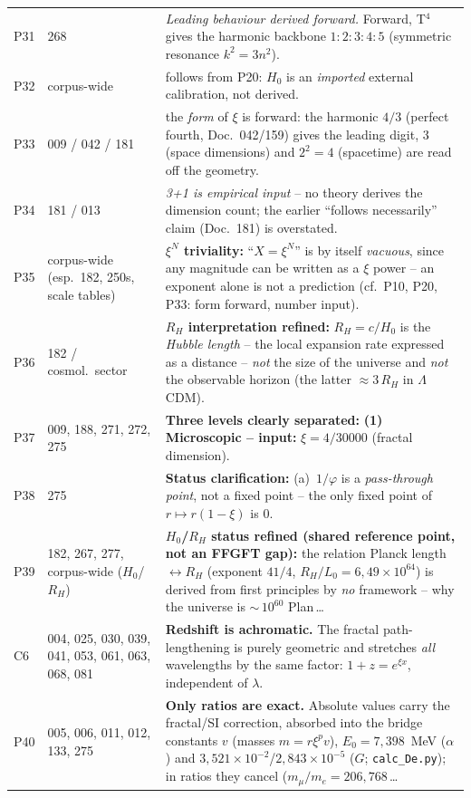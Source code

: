 \begin{longtable}{@{}p{0.9cm}p{3.1cm}p{10.2cm}@{}}
P31 & 268 & \emph{Leading behaviour derived forward.} Forward, T$^4$ gives the harmonic backbone $1:2:3:4:5$ (symmetric resonance $k^2=3n^2$). \\
P32 & corpus-wide & follows from P20: $H_0$ is an \emph{imported} external calibration, not derived. \\
P33 & 009 / 042 / 181 & the \emph{form} of $\xi$ is forward: the harmonic $4/3$ (perfect fourth, Doc.~042/159) gives the leading digit, $3$ (space dimensions) and $2^2{=}4$ (spacetime) are read off the geometry. \\
P34 & 181 / 013 & \emph{3+1 is empirical input} -- no theory derives the dimension count; the earlier \enquote{follows necessarily} claim (Doc.~181) is overstated. \\
P35 & corpus-wide (esp.\ 182, 250s, scale tables) & \textbf{$\xi^N$ triviality:} \enquote{$X = \xi^N$} is by itself \emph{vacuous}, since any magnitude can be written as a $\xi$ power -- an exponent alone is not a prediction (cf.\ P10, P20, P33: form forward, number input). \\
P36 & 182 / cosmol.\ sector & \textbf{$R_H$ interpretation refined:} $R_H = c/H_0$ is the \emph{Hubble length} -- the local expansion rate expressed as a distance -- \emph{not} the size of the universe and \emph{not} the observable horizon (the latter $\approx 3\,R_H$ in $\Lambda$CDM). \\
P37 & 009, 188, 271, 272, 275 & \textbf{Three levels clearly separated:} \newline \textbf{(1) Microscopic -- input:} $\xi = 4/30000$ (fractal dimension). \\
P38 & 275 & \textbf{Status clarification:} (a)~$1/\varphi$ is a \emph{pass-through point}, not a fixed point -- the only fixed point of $r\mapsto r(1-\xi)$ is $0$. \\
P39 & 182, 267, 277, corpus-wide ($H_0$/$R_H$) & \textbf{$H_0$/$R_H$ status refined (shared reference point, not an FFGFT gap):} the relation Planck length$\leftrightarrow R_H$ (exponent $41/4$, $R_H/L_0 = 6{,}49\times10^{64}$) is derived from first principles by \emph{no} framework -- why the universe is $\sim$\,$10^{60}$ Plan\,\ldots \\
C6 & 004, 025, 030, 039, 041, 053, 061, 063, 068, 081 & \textbf{Redshift is achromatic.} The fractal path-lengthening is purely geometric and stretches \emph{all} wavelengths by the same factor: $1+z=e^{\xi x}$, independent of $\lambda$. \\
P40 & 005, 006, 011, 012, 133, 275 & \textbf{Only ratios are exact.} Absolute values carry the fractal/SI correction, absorbed into the bridge constants $v$ (masses $m=r\xi^p v$), $E_0=7{,}398$~MeV ($\alpha$) and $3{,}521\times10^{-2}$/$2{,}843\times10^{-5}$ ($G$; \texttt{calc\_De.py}); in ratios they cancel ($m_\mu/m_e=206{,}768$\,\ldots \\

\end{longtable}
